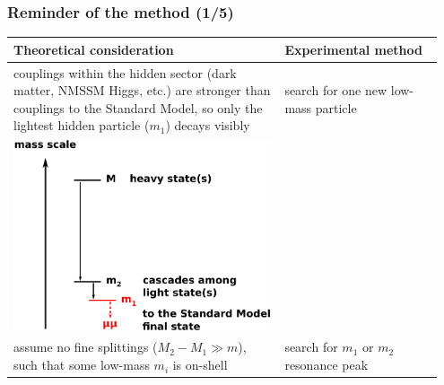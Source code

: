 \documentclass[compress]{beamer}
\begin{document}
\begin{frame}
\frametitle{Reminder of the method (1/5)}

\renewcommand{\arraystretch}{1.7}
\begin{tabular}{p{0.6\linewidth} | p{0.35\linewidth}}
Theoretical consideration & Experimental method \\\hline

couplings within the hidden sector (dark matter, NMSSM Higgs, etc.) are stronger than couplings to the Standard Model, so only the lightest hidden particle ($m_1$) decays visibly & search for one new low-mass particle \\

\centering \includegraphics[width=0.8\linewidth]{basic_picture4.pdf} & \\

assume no fine splittings ($M_2 - M_1 \gg m$), such that some low-mass $m_i$ is on-shell & search for $m_1$ or $m_2$ resonance peak \\
\end{tabular}
\end{frame}
\end{document}
